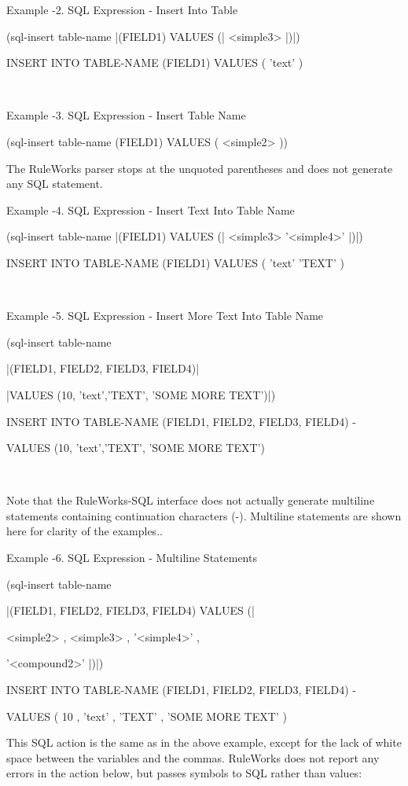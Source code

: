 Example -2. SQL Expression - Insert Into Table

        (sql-insert table-name |(FIELD1) VALUES (|
        <simple3> |)|)

        INSERT INTO TABLE-NAME (FIELD1) VALUES (
        'text' )

         

Example -3. SQL Expression - Insert Table Name

        (sql-insert table-name (FIELD1) VALUES (
        <simple2> ))

The RuleWorks parser stops at the unquoted
parentheses and does not generate any SQL
statement.

Example -4. SQL Expression - Insert Text Into Table
Name

        (sql-insert table-name |(FIELD1) VALUES (|
        <simple3> '<simple4>' |)|)

        INSERT INTO TABLE-NAME (FIELD1) VALUES (
        'text' 'TEXT' )

         

Example -5. SQL Expression - Insert More Text Into
Table Name

        (sql-insert table-name

        |(FIELD1, FIELD2, FIELD3, FIELD4)|

        |VALUES (10, 'text','TEXT', 'SOME MORE
        TEXT')|)

        INSERT INTO TABLE-NAME (FIELD1, FIELD2,
        FIELD3, FIELD4) -

        VALUES (10, 'text','TEXT', 'SOME MORE
        TEXT')

         

Note that the RuleWorks-SQL interface does not
actually generate multiline statements containing
continuation characters (-). Multiline statements
are shown here for clarity of the examples..

Example -6. SQL Expression - Multiline Statements

        (sql-insert table-name

        |(FIELD1, FIELD2, FIELD3, FIELD4) VALUES (|

        <simple2> , <simple3> , '<simple4>' ,

        '<compound2>' |)|)

        INSERT INTO TABLE-NAME (FIELD1, FIELD2,
        FIELD3, FIELD4) -

        VALUES ( 10 , 'text' , 'TEXT' , 'SOME MORE
        TEXT' )

This SQL action is the same as in the above
example, except for the lack of white space between
the variables and the commas. RuleWorks does not
report any errors in the action below, but passes
symbols to SQL rather than values:

